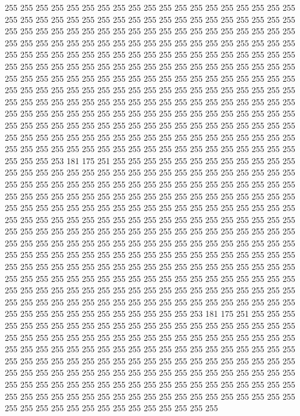 255 255 255 255 255 255 255 255 255 255 255 255 255 255 255 255 255 255 255 255
255 255 255 255 255 255 255 255 255 255 255 255 255 255 255 255 255 255 255 255
255 255 255 255 255 255 255 255 255 255 255 255 255 255 255 255 255 255 255 255
255 255 255 255 255 255 255 255 255 255 255 255 255 255 255 255 255 255 255 255
255 255 255 255 255 255 255 255 255 255 255 255 255 255 255 255 255 255 255 255
255 255 255 255 255 255 255 255 255 255 255 255 255 255 255 255 255 255 255 255
255 255 255 255 255 255 255 255 255 255 255 255 255 255 255 255 255 255 255 255
255 255 255 255 255 255 255 255 255 255 255 255 255 255 255 255 255 255 255 255
255 255 255 255 255 255 255 255 255 255 255 255 255 255 255 255 255 255 255 255
255 255 255 255 255 255 255 255 255 255 255 255 255 255 255 255 255 255 255 255
255 255 255 255 255 255 255 255 255 255 255 255 255 255 255 255 255 255 255 255
255 255 255 255 255 255 255 255 255 255 255 255 255 255 255 255 255 255 255 255
255 255 255 255 255 255 255 255 255 255 253 181 175 251 255 255 255 255 255 255
255 255 255 255 255 255 255 255 255 255 255 255 255 255 255 255 255 255 255 255
255 255 255 255 255 255 255 255 255 255 255 255 255 255 255 255 255 255 255 255
255 255 255 255 255 255 255 255 255 255 255 255 255 255 255 255 255 255 255 255
255 255 255 255 255 255 255 255 255 255 255 255 255 255 255 255 255 255 255 255
255 255 255 255 255 255 255 255 255 255 255 255 255 255 255 255 255 255 255 255
255 255 255 255 255 255 255 255 255 255 255 255 255 255 255 255 255 255 255 255
255 255 255 255 255 255 255 255 255 255 255 255 255 255 255 255 255 255 255 255
255 255 255 255 255 255 255 255 255 255 255 255 255 255 255 255 255 255 255 255
255 255 255 255 255 255 255 255 255 255 255 255 255 255 255 255 255 255 255 255
255 255 255 255 255 255 255 255 255 255 255 255 255 255 255 255 255 255 255 255
255 255 255 255 255 255 255 255 255 255 255 255 255 255 255 255 255 255 255 255
255 255 255 255 255 255 255 255 255 255 255 255 255 255 255 255 255 255 255 255
255 255 255 255 255 255 253 181 175 251 255 255 255 255 255 255 255 255 255 255
255 255 255 255 255 255 255 255 255 255 255 255 255 255 255 255 255 255 255 255
255 255 255 255 255 255 255 255 255 255 255 255 255 255 255 255 255 255 255 255
255 255 255 255 255 255 255 255 255 255 255 255 255 255 255 255 255 255 255 255
255 255 255 255 255 255 255 255 255 255 255 255 255 255 255 255 255 255 255 255
255 255 255 255 255 255 255 255 255 255 255 255 255 255 255 255 255 255 255 255
255 255 255 255 255 255 255 255 255 255 255 255 255 255 255 255 255 255 255 255
255 255 255 255 255 255 255 255 255 255 255 255 255 255 255 255 255 255 255 255
